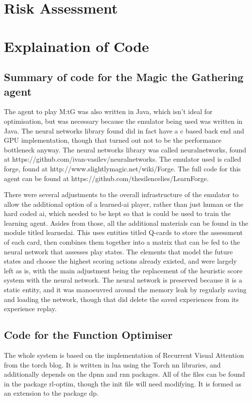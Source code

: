 \appendix
\section{Risk Assessment}



\section{Explaination of Code}

\subsection{Summary of code for the Magic the Gathering agent}
The agent to play M:tG was also written in Java, which isn't ideal for optimisation, but was necessary because the emulator being used was written in Java. The neural networks library found did in fact have a c based back end and GPU implementation, though that turned out not to be the performance bottleneck anyway. The neural networks library was called neuralnetworks, found at https://github.com/ivan-vasilev/neuralnetworks. The emulator used is called forge, found at http://www.slightlymagic.net/wiki/Forge. The full code for this agent can be found at https://github.com/thesilencelies/LearnForge. 

There were several adjustments to the overall infrastructure of the emulator to allow the additional option of a learned-ai player, rather than just human or the hard coded ai, which needed to be kept so that is could be used to train the learning agent. Asides from those, all the additional materials can be found in the module titled learnedai. This uses entities titled Q-cards to store the assessment of each card, then combines them together into a matrix that can be fed to the neural network that assesses play states. The elements that model the future states and choose the highest scoring actions already existed, and were largely left as is, with the main adjustment being the replacement of the heuristic score system with the neural network.
The neural network is preserved because it is a static entity, and it was manoeuvred around the memory leak by regularly saving and loading the network, though that did delete the saved experiences from its experience replay.

\subsection{Code for the Function Optimiser}
The whole system is based on the implementation of Recurrent Visual Attention from the torch blog\cite{Torch:RVA}. It is written in lua using the Torch nn libraries, and additionally depends on the dpnn and rnn packages. All of the files can be found in the package rl-optim, though the init file will need modifying. It is formed as an extension to the package dp.

